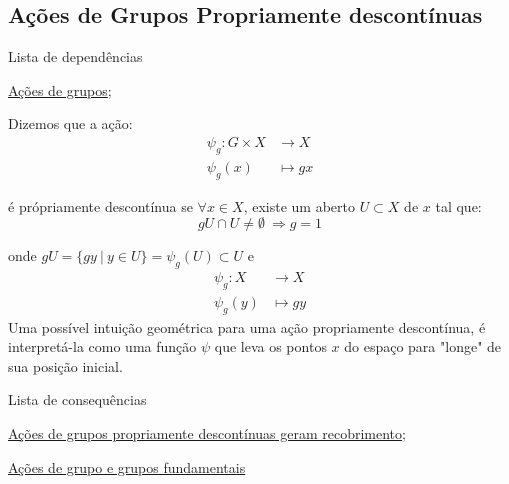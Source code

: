 \subsection{Ações de Grupos Propriamente descontínuas}
\label{ações-de-grupo-propriamente-descontínuas-def}
\begin{titlemize}{Lista de dependências}
	\item \hyperref[ações-de-grupo-def]{Ações de grupos};\\ %
\end{titlemize}
\begin{defi}
	Dizemos que a ação:
	\begin{align*}
    		\psi_{g}: G\times X &\longrightarrow X\\
    		\psi_{g}(x) &\longmapsto gx
	\end{align*}

\noindent é própriamente descontínua se $\forall x \in X$, existe um aberto $U \subset X$ de $x$ tal que:
\[gU \cap U \neq \emptyset \  \Rightarrow g = 1\]

\noindent onde $gU = \{gy\  |\  y \in U\} = \psi_{g}(U) \subset U$ e
\begin{align*}
    \psi_{g}: X&\longrightarrow X\\
    \psi_{g}(y)&\longmapsto gy
\end{align*}
Uma possível intuição geométrica para uma ação propriamente descontínua, é interpretá-la como uma função $\psi$ que leva os pontos $x$ do espaço para "longe" de sua posição inicial.
\end{defi}
\begin{titlemize}{Lista de consequências}
	\item \hyperref[ações-de-grupos-e-recobrimentos-prop]{Ações de grupos propriamente descontínuas geram recobrimento}; %
    \item \hyperref[ações-de-grupos-e-gr-fundamental-prop]{Ações de grupo e grupos fundamentais}
\end{titlemize}

